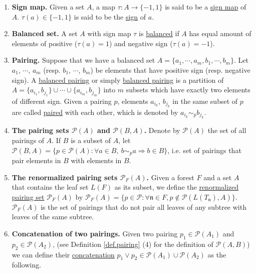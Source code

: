 \begin{defn}\label{def.pairing}
\begin{enumerate}
    \item \textbf{Sign map.} Given a set $A$, a map $\tau:A\rightarrow \{-1,1\}$ is said to be a \underline{sign map} of $A$. $\tau(a)\in \{-1,1\}$ is said to be the \underline{sign} of $a$. 
    \item \textbf{Balanced set.} A set $A$ with sign map $\tau$ is \underline{balanced} if $A$ has equal amount of elements of positive ($\tau(a)=1$) and negative sign ($\tau(a)=-1$).
    \item \textbf{Pairing.} Suppose that we have a balanced set $A=\{a_1,\cdots,a_{m}, b_1, \cdots,b_m\}$. Let $a_1$, $\cdots$, $a_{m}$ (resp. $b_1$, $\cdots$, $b_{m}$) be elements that have positive sign (resp. negative sign). A \underline{balanced pairing} or simply \underline{balanced pairing} is a partition of $A=\{a_{i_1},b_{j_1}\}\cup\cdots\cup \{a_{i_{m}},b_{j_m}\}$ into $m$ subsets which have exactly two elements of different sign. Given a pairing $p$, elements $a_{i_{k}}$, $b_{j_{k}}$ in the same subset of $p$ are called \underline{paired} with each other, which is denoted by $a_{i_{k}}\sim_{p} b_{j_{k}}$.
    \item \textbf{The pairing sets $\mathcal{P}(A)$ and $\mathcal{P}(B,A)$.} Denote by $\mathcal{P}(A)$ the set of all pairings of $A$. If $B$ is a subset of $A$, let $\mathcal{P}(B,A)=\{p\in \mathcal{P}(A):\forall a\in B,\ b\sim_{p}a \Rightarrow b\in B\}$, i.e. set of pairings that pair elements in $B$ with elements in $B$. 
    \item \textbf{The renormalized pairing sets $\mathcal{P}_F(A)$.} Given a forest $F$ and a set $A$ that contains the leaf set $L(F)$ as its subset, we define the \underline{renormalized pairing set} $\mathcal{P}_F(A)$ by $\mathcal{P}_F(A)=\{p\in\mathcal{P}:\forall \mathfrak{n}\in F,p\notin \mathcal{P}(L(T_{\mathfrak{n}}),A)\}$. $\mathcal{P}_F(A)$ is the set of pairings that do not pair all leaves of any subtree with leaves of the same subtree.
    \item \textbf{Concatenation of two pairings.} Given two pairing $p_1\in\mathcal{P}(A_1)$ and $p_2\in\mathcal{P}(A_2)$, (see Definition \ref{def.pairing} (4) for the definition of $\mathcal{P}(A,B)$) we can define their \underline{concatenation} $p_1\vee p_2\in \mathcal{P}(A_1)\cup \mathcal{P}(A_2)$ as the following. 
    

\end{enumerate}
\end{defn}
